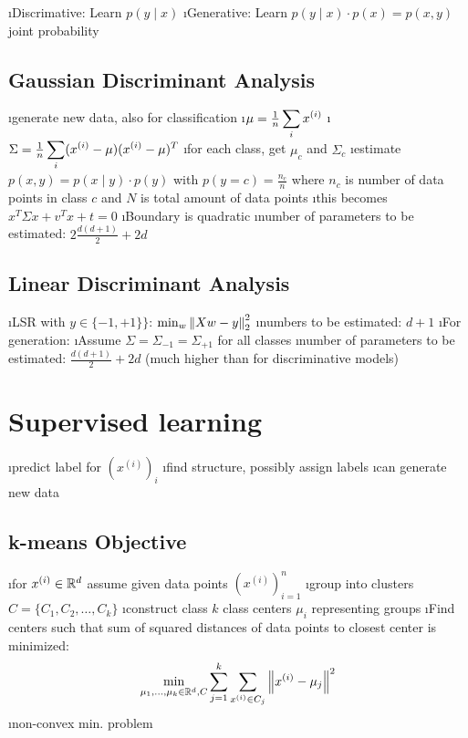 \bi
\i Discrimative: Learn $p(y \mid x)$
\i Generative: Learn $p(y \mid x) \cdot p(x) = p(x, y)$ joint probability
\ei

\subsection{Gaussian Discriminant Analysis}

\bi
\i generate new data, also for classification
\i $\mu = \frac{1}{n} \displaystyle\sum_i x^{(i)}$
\i $\Sigma = \frac{1}{n} \displaystyle\sum_i (x^{(i)} - \mu) (x^{(i)} - \mu)^T$
\i for each class, get $\mu_c$ and $\Sigma_c$
\i estimate $p(x,y) = p(x \mid y) \cdot p(y)$ with $p(y=c) = \frac{n_c}{n}$ where $n_c$ is number of data points in class $c$ and $N$ is total amount of data points
\i this becomes $x^T \Sigma x + v^Tx + t=0$
\i Boundary is quadratic
\i number of parameters to be estimated: $2 \frac{d(d+1)}{2} + 2d$
\ei

\subsection{Linear Discriminant Analysis}

\bi
\i LSR with $y \in \{-1, +1\}\}$: $\min_w \left\lVert Xw-y\right\rVert_2^2$
\i numbers to be estimated: $d+1$
\i For generation:
\bi
\i Assume $\Sigma = \Sigma_{-1} = \Sigma_{+1}$ for all classes
\i number of parameters to be estimated: $\frac{d(d+1)}{2} + 2d$ (much higher than for discriminative models)
\ei
\ei

\section{Supervised learning}

\bi
\i predict label for $(x^{(i)})_i$
\i find structure, possibly assign labels
\i can generate new data
\ei

\subsection{k-means Objective}

\bi
\i for $x^{(i)} \in \mathbb{R}^d$ assume given data points $(x^{(i)})^n_{i=1}$
\i group into clusters $C = \{C_1, C_2, \ldots, C_k\}$
\i construct class $k$ class centers $\mu_i$ representing groups
\i Find centers such that sum of squared distances of data points to closest center is minimized: \[
\min_{\mu_1, \ldots, \mu_k \in \mathbb{R}^d, C} \displaystyle\sum_{j=1}^k \displaystyle\sum_{x^{(i)} \in C_j} \left\lVert x^{(i)} - \mu_j\right\rVert^2
\]
\i non-convex min. problem
\ei

